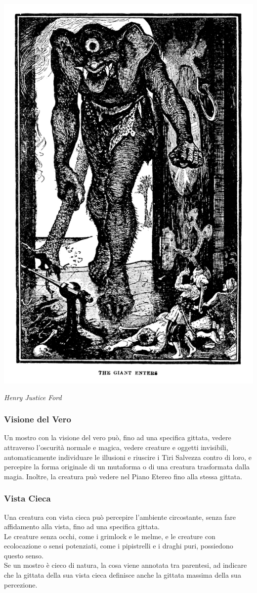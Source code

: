 \begin{multicols}{2}
\begin{center}
\includegraphics[width=0.7\linewidth]{immagini/ciclope.png}
	
\textit{Henry Justice Ford}

\end{center}

\subsubsection{Visione del Vero}

Un mostro con la visione del vero può, fino ad una specifica gittata, vedere attraverso l'oscurità normale e magica, vedere creature e oggetti invisibili, automaticamente individuare le illusioni e riuscire i Tiri Salvezza contro di loro, e percepire la forma originale di un mutaforma o di una creatura trasformata dalla magia. Inoltre, la creatura può vedere nel Piano Etereo fino alla stessa gittata.


\subsubsection{Vista Cieca}

Una creatura con vista cieca può percepire l'ambiente circostante, senza fare affidamento alla vista, fino ad una specifica gittata. \\
Le creature senza occhi, come i grimlock e le melme, e le creature con ecolocazione o sensi potenziati, come i pipistrelli e i draghi puri, possiedono questo senso. \\
Se un mostro è cieco di natura, la cosa viene annotata tra parentesi, ad indicare che la gittata della sua vista cieca definisce anche la gittata massima della sua percezione.\\


\end{multicols}
